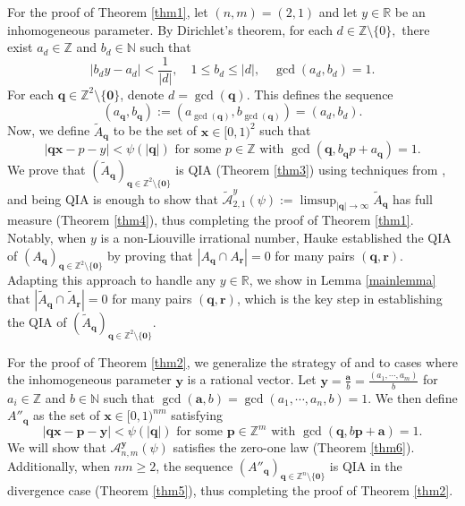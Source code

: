 \documentclass[reqno]{amsart}
\theoremstyle{definition}
\theoremstyle{remark}
\begin{document}
For the proof of Theorem \ref{thm1}, let $(n,m) = (2,1)$ and let $y \in \mathbb{R}$ be an inhomogeneous parameter. By Dirichlet's theorem, for each $d \in \mathbb{Z}\setminus\{0\},$ there exist $a_d \in \mathbb{Z}$ and $b_d \in \mathbb{N}$ such that
\begin{equation}\label{a,b}
    |b_d y - a_d| < \frac{1}{|d|}, \quad 1\leq b_d \leq |d|, \quad \gcd(a_d, b_d) = 1.
\end{equation}
For each $\mathbf{q} \in \mathbb{Z}^2 \setminus \{ \mathbf{0} \}$, denote $d= \gcd(\mathbf{q})$. This defines the sequence
\begin{equation}\label{a,b,q}
    (a_\mathbf{q}, b_\mathbf{q}) := (a_{\gcd(\mathbf{q})}, b_{\gcd(\mathbf{q})}) = (a_d, b_d).
\end{equation}
Now, we define $\tilde{A}_\mathbf{q}$ to be the set of $\mathbf{x} \in [0,1)^2$ such that
$$|\mathbf{qx} - p - y| < \psi(|\mathbf{q}|) \text{ for some } p \in \mathbb{Z} \text{ with } \gcd(\mathbf{q}, b_\mathbf{q}p+a_\mathbf{q}) = 1.$$
We prove that $(\tilde{A}_\mathbf{q})_{\mathbf{q} \in \mathbb{Z}^2 \setminus \{ \mathbf{0}\}}$ is QIA (Theorem \ref{thm3}) using techniques from \cite{Hau23}, and being QIA is enough to show that $\tilde{\mathscr{A}}^y_{2,1}(\psi) := \limsup_{|\mathbf{q}| \to \infty} \tilde{A}_\mathbf{q}$ has full measure (Theorem \ref{thm4}), thus completing the proof of Theorem \ref{thm1}. Notably, when $y$ is a non-Liouville irrational number, Hauke \cite{Hau23} established the QIA of $(A_\mathbf{q})_{\mathbf{q} \in \mathbb{Z}^2 \setminus \{\mathbf{0}\}}$ by proving that $|A_\mathbf{q} \cap A_\mathbf{r}|=0$ for many pairs $(\mathbf{q}, \mathbf{r})$. Adapting this approach to handle any $y \in \mathbb{R}$, we show in Lemma \ref{mainlemma} that $|\tilde{A}_\mathbf{q} \cap \tilde{A}_\mathbf{r}|=0$ for many pairs $(\mathbf{q}, \mathbf{r})$, which is the key step in establishing the QIA of $(\tilde{A}_\mathbf{q})_{\mathbf{q} \in \mathbb{Z}^2 \setminus \{ \mathbf{0}\}}$.

For the proof of Theorem \ref{thm2}, we generalize the strategy of \cite{BV08} and \cite{BV09} to cases where the inhomogeneous parameter $\mathbf{y}$ is a rational vector. Let $\mathbf{y} = \frac{\mathbf{a}}{b} = \frac{(a_1, \cdots, a_m)}{b}$ for $a_i \in \mathbb{Z}$ and $b \in \mathbb{N}$ such that $\gcd(\mathbf{a},b) = \gcd(a_1, \cdots, a_n, b) = 1$. We then define $A''_\mathbf{q}$ as the set of $\mathbf{x} \in [0,1)^{nm}$ satisfying
$$|\mathbf{qx} - \mathbf{p} - \mathbf{y}|< \psi(|\mathbf{q}|) \text{ for some } \mathbf{p} \in \mathbb{Z}^m \text{ with } \gcd(\mathbf{q},b\mathbf{p} + \mathbf{a})=1.$$
We will show that $\mathscr{A}_{n,m}^{\mathbf{y}}(\psi)$ satisfies the zero-one law (Theorem \ref{thm6}). Additionally, when $nm \geq 2$, the sequence $(A''_\mathbf{q})_{\mathbf{q} \in \mathbb{Z}^n \setminus \{\mathbf{0}\}}$ is QIA in the divergence case (Theorem \ref{thm5}), thus completing the proof of Theorem \ref{thm2}.
\end{document}
